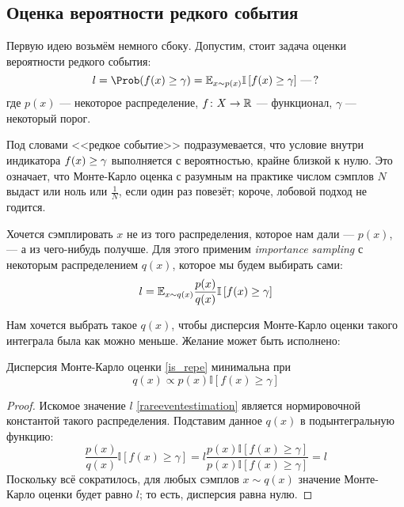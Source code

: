 \subsection{Оценка вероятности редкого события}

Первую идею возьмём немного сбоку. Допустим, стоит задача оценки вероятности редкого события:
\begin{equation}\label{rareeventestimation}
l = \Prob(f(x) \ge \gamma) = \E_{x \sim p(x)} \mathbb{I}\left[ f(x) \ge \gamma \right] \,\text{---}\, ?
\end{equation}
где $p(x)$ --- некоторое распределение, $f \colon X \to \mathbb{R}$ --- функционал, $\gamma$ --- некоторый порог. 

Под словами <<редкое событие>> подразумевается, что условие внутри индикатора $f(x) \HM\ge \gamma$ выполняется с вероятностью, крайне близкой к нулю. Это означает, что Монте-Карло оценка с разумным на практике числом сэмплов $N$ выдаст или ноль или $\frac{1}{N}$, если один раз повезёт; короче, лобовой подход не годится.

Хочется сэмплировать $x$ не из того распределения, которое нам дали --- $p(x)$, --- а из чего-нибудь получше. Для этого применим \emph{importance sampling} с некоторым распределением $q(x)$, которое мы будем выбирать сами:
\begin{equation}\label{is_repe}
l = \mathbb{E}_{x \sim q(x)} \frac{p(x)}{q(x)} \mathbb{I}\left[ f(x) \ge \gamma \right]
\end{equation}

Нам хочется выбрать такое $q(x)$, чтобы дисперсия Монте-Карло оценки такого интеграла была как можно меньше. Желание может быть исполнено:
\begin{proposition}
Дисперсия Монте-Карло оценки \eqref{is_repe} минимальна при 
\begin{equation}\label{optimal_q_is_repe}
q(x) \propto p(x)\mathbb{I}\left[ f(x) \ge \gamma \right]
\end{equation}

\begin{proof}
Искомое значение $l$ \eqref{rareeventestimation} является нормировочной константой такого распределения. Подставим данное $q(x)$ в подынтегральную функцию:
$$
\frac{p(x)}{q(x)} \mathbb{I}\left[ f(x) \ge \gamma \right] = l \frac{p(x)\mathbb{I}\left[ f(x) \ge \gamma \right]}{p(x)\mathbb{I}\left[ f(x) \ge \gamma \right]} = l
$$
Поскольку всё сократилось, для любых сэмплов $x \sim q(x)$ значение Монте-Карло оценки будет равно $l$; то есть, дисперсия равна нулю.
\end{proof}
\end{proposition}

